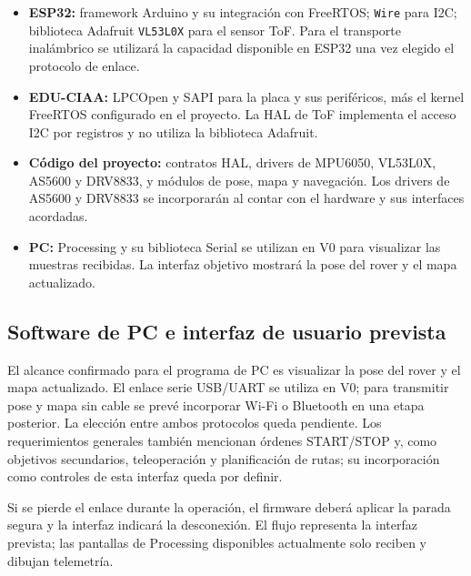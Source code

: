 \begin{itemize}
  \item \textbf{ESP32:} framework Arduino y su integración con FreeRTOS;
        \texttt{Wire} para I2C; biblioteca Adafruit \texttt{VL53L0X} para el
        sensor ToF. Para el transporte inalámbrico se utilizará la capacidad
        disponible en ESP32 una vez elegido el protocolo de enlace.
  \item \textbf{EDU-CIAA:} LPCOpen y SAPI para la placa y sus periféricos, más
        el kernel FreeRTOS configurado en el proyecto. La HAL de ToF implementa
        el acceso I2C por registros y no utiliza la biblioteca Adafruit.
  \item \textbf{Código del proyecto:} contratos HAL, drivers de MPU6050,
        VL53L0X, AS5600 y DRV8833, y módulos de pose, mapa y navegación. Los
        drivers de AS5600 y DRV8833 se incorporarán al contar con el hardware y
        sus interfaces acordadas.
  \item \textbf{PC:} Processing y su biblioteca Serial se utilizan en V0 para
        visualizar las muestras recibidas. La interfaz objetivo mostrará la
        pose del rover y el mapa actualizado.
\end{itemize}

\subsection{Software de PC e interfaz de usuario prevista}

El alcance confirmado para el programa de PC es visualizar la pose del rover y
el mapa actualizado. El enlace serie USB/UART se utiliza en V0; para transmitir
pose y mapa sin cable se prevé incorporar Wi-Fi o Bluetooth en una etapa
posterior. La elección entre ambos protocolos queda pendiente. Los
requerimientos generales también mencionan órdenes START/STOP y, como objetivos
secundarios, teleoperación y planificación de rutas; su incorporación como
controles de esta interfaz queda por definir.

\begin{center}
\end{center}

Si se pierde el enlace durante la operación, el firmware deberá aplicar la
parada segura y la interfaz indicará la desconexión. El flujo representa la
interfaz prevista; las pantallas de Processing disponibles actualmente solo
reciben y dibujan telemetría.


